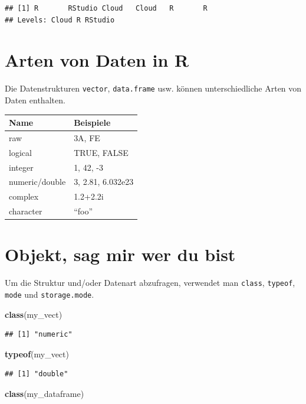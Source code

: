 \documentclass[]{book}
\newenvironment{Shaded}{\begin{snugshade}}{\end{snugshade}}
\newcommand{\KeywordTok}[1]{\textcolor[rgb]{0.13,0.29,0.53}{\textbf{#1}}}
\newcommand{\NormalTok}[1]{#1}
\begin{document}
\begin{verbatim}
## [1] R       RStudio Cloud   Cloud   R       R      
## Levels: Cloud R RStudio
\end{verbatim}

\hypertarget{arten-von-daten-in-r}{%
\section{Arten von Daten in R}\label{arten-von-daten-in-r}}

Die Datenstrukturen \texttt{vector}, \texttt{data.frame} usw. können unterschiedliche Arten von Daten enthalten.

\begin{longtable}[]{@{}ll@{}}
\toprule
Name & Beispiele\tabularnewline
\midrule
\endhead
raw & 3A, FE\tabularnewline
logical & TRUE, FALSE\tabularnewline
integer & 1, 42, -3\tabularnewline
numeric/double & 3, 2.81, 6.032e23\tabularnewline
complex & 1.2+2.2i\tabularnewline
character & ``foo''\tabularnewline
\bottomrule
\end{longtable}

\hypertarget{objekt-sag-mir-wer-du-bist}{%
\section{Objekt, sag mir wer du bist}\label{objekt-sag-mir-wer-du-bist}}

Um die Struktur und/oder Datenart abzufragen, verwendet man \texttt{class}, \texttt{typeof}, \texttt{mode} und \texttt{storage.mode}.

\begin{Shaded}
\begin{Highlighting}[]
\KeywordTok{class}\NormalTok{(my_vect)}
\end{Highlighting}
\end{Shaded}

\begin{verbatim}
## [1] "numeric"
\end{verbatim}

\begin{Shaded}
\begin{Highlighting}[]
\KeywordTok{typeof}\NormalTok{(my_vect)}
\end{Highlighting}
\end{Shaded}

\begin{verbatim}
## [1] "double"
\end{verbatim}

\begin{Shaded}
\begin{Highlighting}[]
\KeywordTok{class}\NormalTok{(my_dataframe)}
\end{Highlighting}
\end{Shaded}
\end{document}
